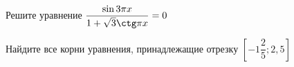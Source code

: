 \begin{ex}
	\begin{condition}
		\begin{enumcols}[label=\asbuk*)]
			\item Решите уравнение \( \dfrac{\sin 3\pi x}{1 + \sqrt{3}\ctg \pi x} = 0 \)
			\item Найдите все корни уравнения, принадлежащие отрезку \( \left[-1\dfrac{2}{5};2,5\right] \)
		\end{enumcols}
	\end{condition}
\end{ex}